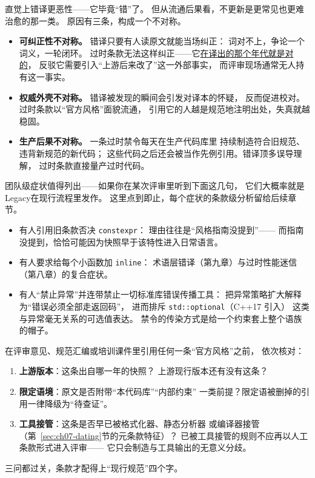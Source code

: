 \documentclass[12pt,a4paper,fontset=fandol]{ctexbook}
\newcommand{\cpp}[1]{C++#1}
\newcommand{\Tp}[1]{\texttt{#1}}
\newcommand{\Lang}[1]{\textsf{#1}}
\newcommand{\DomTra}{\Lang{Legacy}}
\begin{document}
直觉上错译更恶性——它毕竟``错''了。
但从流通后果看，不更新是更常见也更难治愈的那一类。
原因有三条，构成一个不对称。

\begin{itemize}
  \item \textbf{可纠正性不对称。} 错译只要有人读原文就能当场纠正：
        词对不上，争论一个词义，一轮闭环。
        过时条款无法这样纠正——它\underline{在译出的那个年代就是对的}，
        反驳它需要引入``上游后来改了''这一外部事实，
        而评审现场通常无人持有这一事实。
  \item \textbf{权威外壳不对称。} 错译被发现的瞬间会引发对译本的怀疑，
        反而促进校对。过时条款以``官方风格''面貌流通，
        引用它的人越是规范地注明出处，失真就越稳固。
  \item \textbf{生产后果不对称。} 一条过时禁令每天在生产代码库里
        持续制造符合旧规范、违背新规范的新代码；
        这些代码之后还会被当作先例引用。错译顶多误导理解，
        过时条款直接量产过时代码。
\end{itemize}

团队级症状值得列出——如果你在某次评审里听到下面这几句，
它们大概率就是 \DomTra 在现行流程里发作。
这里点到即止，每个症状的条款级分析留给后续章节。

\begin{itemize}
  \item 有人引用旧条款否决 \Tp{constexpr}：
        理由往往是``风格指南没提到''——
        而指南没提到，恰恰可能因为快照早于该特性进入日常语言。
  \item 有人要求给每个小函数加 \Tp{inline}：
        术语层错译（第九章）与过时性能迷信（第八章）的复合症状。
  \item 有人``禁止异常''并连带禁止一切标准库错误传播工具：
        把异常策略扩大解释为``错误必须全部走返回码''，
        进而排斥 \Tp{std::optional}（\cpp{17} 引入）
        这类与异常毫无关系的可选值表达。
        禁令的传染方式是给一个约束套上整个语族的帽子。
\end{itemize}

\begin{warning}[title={引用条款前先核对三件事}]
  在评审意见、规范汇编或培训课件里引用任何一条``官方风格''之前，
  依次核对：
  \begin{enumerate}[label=(\roman*), leftmargin=2.6em]
    \item \textbf{上游版本}：这条出自哪一年的快照？
          上游现行版本还有没有这条？
    \item \textbf{限定语境}：原文是否附带``本代码库''``内部约束''
          一类前提？限定语被删掉的引用一律降级为``待查证''。
    \item \textbf{工具接管}：这条是否早已被格式化器、静态分析器
          或编译器接管（第~\ref{sec:ch07-dating}节的元条款特征）？
          已被工具接管的规则不应再以人工条款形式进入评审——
          它只会制造与工具输出的无意义分歧。
  \end{enumerate}
  三问都过关，条款才配得上``现行规范''四个字。
\end{warning}
\end{document}
